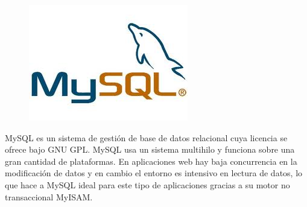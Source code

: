 \begin{figure}
	\includegraphics[scale=.3]{img/mysql-logo.jpg}
\end{figure}

MySQL es un sistema de gestión de base de datos relacional cuya licencia se ofrece bajo GNU GPL.
MySQL usa un sistema multihilo y funciona sobre una gran cantidad de plataformas.
En aplicaciones web hay baja concurrencia en la modificación de datos y en cambio el entorno es intensivo en lectura de datos, lo que hace a MySQL ideal para este tipo de aplicaciones gracias a su motor no transaccional MyISAM.